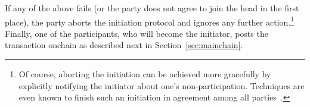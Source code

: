 If any of the above fails (or the party does not agree to join the head in the
first place), the party aborts the initiation protocol and ignores any further
action.\footnote{Of course, aborting the initiation can be achieved more
  gracefully by explicitly notifying the initiator about one's
  non-participation. Techniques are even known to finish such an initiation in
  agreement among all parties~\cite{PODC:FGHHS02}.} Finally, one of the
participants, who will become the initiator, posts the \mtxInit{} transaction
onchain as described next in Section~\ref{sec:mainchain}.



